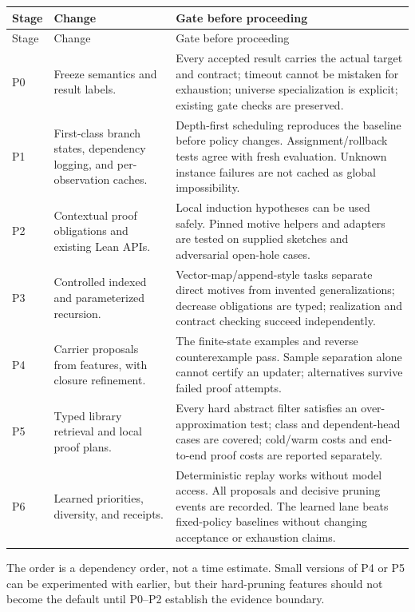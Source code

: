 \documentclass[11pt,a4paper]{article}
\newcommand{\code}[1]{\texttt{\detokenize{#1}}}
\theoremstyle{definition}
\theoremstyle{remark}
\begin{document}
\begin{longtable}{@{}P{18mm}P{47mm}P{84mm}@{}}
\toprule
Stage & Change & Gate before proceeding\\
\midrule
\endfirsthead
\toprule Stage & Change & Gate before proceeding\\\midrule
\endhead
P0 & Freeze semantics and result labels. & Every accepted result carries the actual target and contract; timeout cannot be mistaken for exhaustion; universe specialization is explicit; existing gate checks are preserved.\\[4pt]
P1 & First-class branch states, dependency logging, and per-observation caches. & Depth-first scheduling reproduces the baseline before policy changes. Assignment/rollback tests agree with fresh evaluation. Unknown instance failures are not cached as global impossibility.\\[4pt]
P2 & Contextual proof obligations and existing Lean APIs. & Local induction hypotheses can be used safely. Pinned motive helpers and \code{cbv} adapters are tested on supplied sketches and adversarial open-hole cases.\\[4pt]
P3 & Controlled indexed and parameterized recursion. & Vector-map/append-style tasks separate direct motives from invented generalizations; decrease obligations are typed; realization and contract checking succeed independently.\\[4pt]
P4 & Carrier proposals from features, with closure refinement. & The finite-state examples and reverse counterexample pass. Sample separation alone cannot certify an updater; alternatives survive failed proof attempts.\\[4pt]
P5 & Typed library retrieval and local proof plans. & Every hard abstract filter satisfies an over-approximation test; class and dependent-head cases are covered; cold/warm costs and end-to-end proof costs are reported separately.\\[4pt]
P6 & Learned priorities, diversity, and receipts. & Deterministic replay works without model access. All proposals and decisive pruning events are recorded. The learned lane beats fixed-policy baselines without changing acceptance or exhaustion claims.\\
\bottomrule
\end{longtable}

The order is a dependency order, not a time estimate. Small versions of P4 or P5 can be experimented with earlier, but their hard-pruning features should not become the default until P0--P2 establish the evidence boundary.
\end{document}
